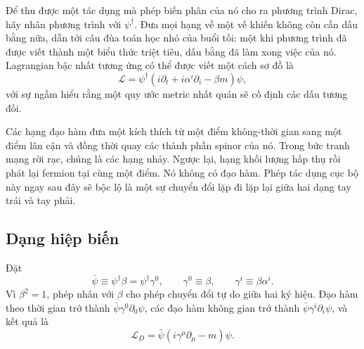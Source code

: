 Để thu được một tác dụng mà phép biến phân của nó cho ra phương trình Dirac, hãy nhân phương trình với \(\psi^\dagger\). Đưa mọi hạng về một vế khiến không còn cần dấu bằng nữa, dẫn tới câu đùa toán học nhỏ của buổi tối: một khi phương trình đã được viết thành một biểu thức triệt tiêu, dấu bằng đã làm xong việc của nó. Lagrangian bậc nhất tương ứng có thể được viết một cách sơ đồ là
\begin{equation}
  \mathcal L
  =
  \psi^\dagger
  \left(i\partial_t+i\alpha^i\partial_i-\beta m\right)\psi ,
  \label{eq:l10-dirac-old-lagrangian}
\end{equation}
với sự ngầm hiểu rằng một quy ước metric nhất quán sẽ cố định các dấu tương đối.

Các hạng đạo hàm đưa một kích thích từ một điểm không-thời gian sang một điểm lân cận và đồng thời quay các thành phần spinor của nó. Trong bức tranh mạng rời rạc, chúng là các hạng nhảy. Ngược lại, hạng khối lượng hấp thụ rồi phát lại fermion tại cùng một điểm. Nó không có đạo hàm. Phép tác dụng cục bộ này ngay sau đây sẽ bộc lộ là một sự chuyển đổi lặp đi lặp lại giữa hai dạng tay trái và tay phải.

\begin{classroomqa}
\end{classroomqa}

\subsection{Dạng hiệp biến}

Đặt
\begin{equation}
  \bar\psi\equiv\psi^\dagger\beta
  =\psi^\dagger\gamma^0,
  \qquad
  \gamma^0\equiv\beta,
  \qquad
  \gamma^i\equiv\beta\alpha^i .
  \label{eq:l10-dirac-adjoint}
\end{equation}
Vì \(\beta^2=1\), phép nhân với \(\beta\) cho phép chuyển đổi tự do giữa hai ký hiệu. Đạo hàm theo thời gian trở thành
\(\bar\psi\gamma^0\partial_0\psi\), các đạo hàm không gian trở thành
\(\bar\psi\gamma^i\partial_i\psi\), và kết quả là
\begin{equation}
  \boxed{\mathcal L_D
  =\bar\psi\left(i\gamma^\mu\partial_\mu-m\right)\psi .}
  \label{eq:l10-covariant-dirac}
\end{equation}

